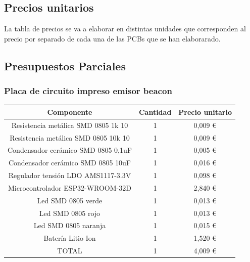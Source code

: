 \documentclass[paper=a4, fontsize=11pt,twoside]{scrartcl}	%
\begin{document}
    \subsection{Precios unitarios}
        La tabla de precios se va a elaborar en distintas unidades que corresponden al precio por separado de cada
        una de las PCBs que se han elaborarado.
    \subsection{Presupuestos Parciales}
            \subsubsection{Placa de circuito impreso emisor beacon}
                \begin{center}
                    \begin{tabular}{||c | c |c ||} 
                    \hline
                    Componente & Cantidad & Precio unitario  \\ [0.5ex] 
                    \hline
                    Resistencia metálica SMD 0805 1k 10  	&1&	 0,009 € \\ 
                    Resistencia metálica SMD 0805 10k 10 	&1&	 0,009 € \\ 
                    Condensador cerámico SMD 0805 0,1uF  	&1&	 0,005 € \\ 
                    Condensador cerámico SMD 0805 10uF   	&1&	 0,016 € \\ 
                    Regulador tensión LDO AMS1117-3.3V   	&1&	 0,098 € \\ 
                    Microcontrolador ESP32-WROOM-32D     	&1&	 2,840 € \\ 
                    Led SMD 0805 verde                   	&1&	 0,013 € \\ 
                    Led SMD 0805 rojo                    	&1&	 0,013 € \\ 
                    Led SMD 0805 naranja                 	&1&	 0,015 € \\ 
                    Batería Litio Ion                    	&1&	 1,520 € \\ 
                    \hline
                    TOTAL                    	            &1&	 4,009 € \\ 

                \hline
                    \end{tabular}
                \end{center}
\end{document}
